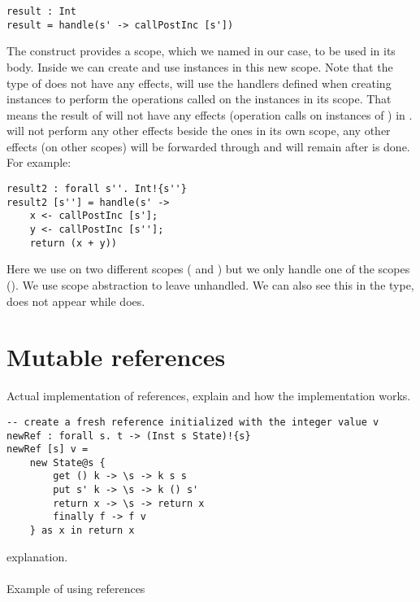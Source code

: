 \begin{verbatim}
result : Int
result = handle(s' -> callPostInc [s'])
\end{verbatim}

The  construct provides a scope, which we named  in our case, to be used in its body.
Inside  we can create and use instances in this new scope.
Note that the type of  does not have any effects,  will use the handlers defined when creating instances to perform the operations called on the instances in its scope.
That means the result of  will not have any effects (operation calls on instances of ) in .
 will not perform any other effects beside the ones in its own scope, any other effects (on other scopes) will be forwarded through and will remain after  is done.
For example:

\begin{verbatim}
result2 : forall s''. Int!{s''}
result2 [s''] = handle(s' ->
	x <- callPostInc [s'];
	y <- callPostInc [s''];
	return (x + y))
\end{verbatim}

Here we use  on two different scopes ( and ) but we only handle one of the scopes ().
We use scope abstraction to leave  unhandled.
We can also see this in the type,  does not appear while  does. 

\section{Mutable references}
Actual implementation of references, explain \ident{[s]} and how the implementation works.

\begin{verbatim}
-- create a fresh reference initialized with the integer value v
newRef : forall s. t -> (Inst s State)!{s}
newRef [s] v =
	new State@s {
		get () k -> \s -> k s s
		put s' k -> \s -> k () s'
		return x -> \s -> return x
		finally f -> f v
	} as x in return x
\end{verbatim}
explanation.
\\\\
Example of using references

